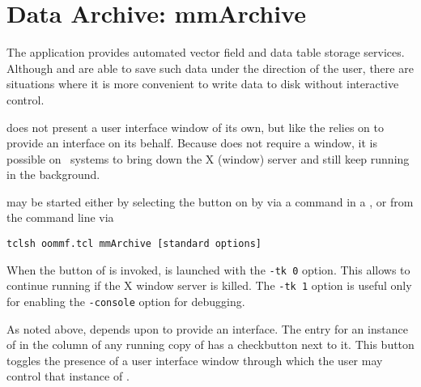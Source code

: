 \chapter{Data Archive: mmArchive}\label{sec:mmarchive}%

\begin{center}
\end{center}

The application  provides automated vector field and data
table storage services.  Although
and
are able to save such data under the direction of the user, there are
situations where it is more convenient to write data to disk without
interactive control.

 does not present a user interface window of its own,
but like the {}
relies on {} to
provide an interface on its behalf.  Because  does not
require a window, it is possible on \Unix\ systems to bring down the X
(window) server and still keep
 running in the background.

 may be started either by selecting the
 button on 
by  via a
command in a 
{},
or from the command line via
\begin{verbatim}
tclsh oommf.tcl mmArchive [standard options]
\end{verbatim}

When the  button of  is invoked,
 is launched with the {{\tt -tk 0}} option.
This allows  to continue running if the X
window server is killed.  The {{\tt -tk 1}} option is useful
only for enabling the {{\tt -console}} option for debugging.

As noted above,  depends upon
 to provide an interface.
The entry for an instance of  in the
 column of any running copy of  has a
checkbutton next to it.  This button toggles the presence of a user
interface window through which the user may control that instance of
.


